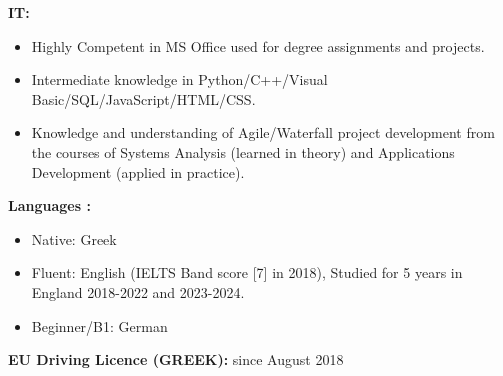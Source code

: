 \textbf{IT: }
\begin{itemize}
    \item Highly Competent in MS Office used for degree assignments and projects.
    \item Intermediate knowledge in Python/C++/Visual Basic/SQL/JavaScript/HTML/CSS.
    \item Knowledge and understanding of Agile/Waterfall project development from the courses of Systems Analysis (learned in theory) and Applications Development (applied in practice).
\end{itemize}



\textbf{Languages :}
\begin{itemize}
    \item Native: Greek
    \item Fluent: English (IELTS Band score [7] in 2018), Studied for 5 years in England 2018-2022 and 2023-2024.
    \item Beginner/B1: German
\end{itemize}

\textbf{EU Driving Licence (GREEK):} since August 2018